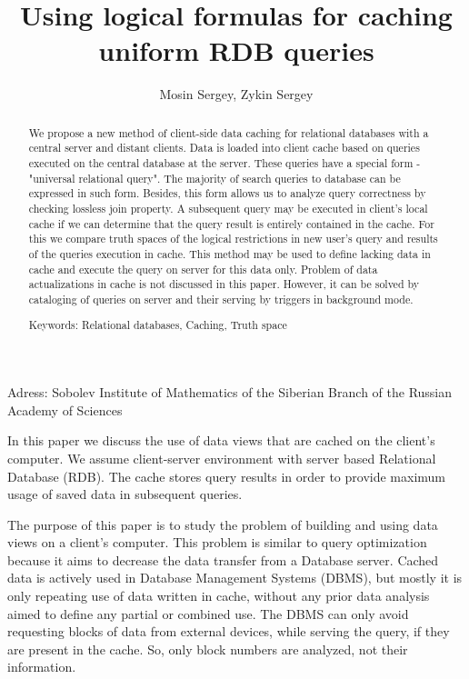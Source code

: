 \documentclass{article}
\author{Mosin Sergey, Zykin Sergey}
\title{Using logical formulas for caching uniform RDB queries}
\begin{document}
\maketitle


Adress: Sobolev Institute of Mathematics of the Siberian Branch
of the Russian Academy of Sciences

\begin{abstract}
We propose a new method of client-side data caching for relational databases
with a central server and distant clients. Data is loaded into client cache
based on queries executed on the central database at the server. These
queries have a special form - "universal relational query". The majority of
search queries to database can be expressed in such form. Besides, this form
allows us to analyze query correctness by checking lossless join property. A
subsequent query may be executed in client's local cache if we can determine
that the query result is entirely contained in the cache. For this we compare
truth spaces of the logical restrictions in new user's query and results of
the queries execution in cache. This method may be used to define lacking data
in cache and execute the query on server for this data only. Problem of data
actualizations in cache is not discussed in this paper. However, it can be
solved by cataloging of queries on server and their serving by triggers in
background mode.

Keywords: Relational databases, Caching, Truth space
\end{abstract}



In this paper we discuss the use of data views that are
cached on the client's computer. We assume client-server environment with
server based Relational Database (RDB). The cache stores query results in order
to provide maximum usage of saved data in subsequent queries.

The purpose of this paper is to study the problem of building and using data
views on a client's computer. This problem is similar to query optimization
because it aims to decrease the data transfer from a Database server. Cached
data is actively used in Database Management Systems (DBMS), but mostly it is
only repeating use of data written in cache, without any prior data analysis
aimed to define any partial or combined use. The DBMS can only avoid requesting
blocks of data from external devices, while serving the query, if they are
present in the cache. So, only block numbers are analyzed, not their information.
\end{document}

